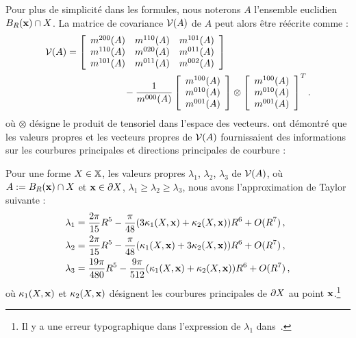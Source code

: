 %
Pour plus de simplicité dans les formules, nous noterons $A$ l'ensemble
euclidien $B_{R}(\mathbf{x}) \cap X$. La matrice de covariance $\mathcal{V}(A)$ de
$A$ peut alors être réécrite comme :
\begin{align}
  \mathcal{V}(A) &=  \left\lbrack
    \begin{array}{ccc}
      m^{200}(A) & m^{110}(A) & m^{101}(A)\\
      m^{110}(A) & m^{020}(A) & m^{011}(A)\\
      m^{101}(A) & m^{011}(A) & m^{002}(A)
    \end{array}
    \right\rbrack\quad\quad\quad\quad\quad\quad \nonumber \\
    &\quad\quad\quad\quad\quad\quad- \frac{1}{m^{000}(A)}
    \left\lbrack
    \begin{array}{c}
      m^{100}(A) \\
      m^{010}(A) \\
      m^{001}(A) \\
    \end{array}
    \right\rbrack
    \otimes
    \left\lbrack
    \begin{array}{c}
      m^{100}(A) \\
      m^{010}(A) \\
      m^{001}(A) \\
    \end{array}
    \right\rbrack^T.
\label{eq:defCov}
\end{align}
%
où $\otimes$ désigne le produit de tensoriel dans l'espace des vecteurs.
%
 ont démontré que les valeurs propres et les
vecteurs propres de $\mathcal{V}(A)$ fournissaient des informations sur les courbures
principales et directions principales de courbure :
%
\begin{lemma}
 \label{lem:pottmann-3d}
 Pour une forme $X \in \mathbb{X}$, les valeurs propres $\lambda_1$,
 $\lambda_2$, $\lambda_3$ de $\mathcal{V}(A)$, où $ A := B_{R}(\mathbf{x}) \cap
 X$ et $\mathbf{x} \in \partial X$, $\lambda_1 \ge \lambda_2 \ge
 \lambda_3$, nous avons l'approximation de Taylor suivante :
 \begin{align}
   \lambda_1& = \frac{2\pi}{15}R^5 - \frac{\pi}{48}(3\kappa_{1}(X,\mathbf{x}) + \kappa_{2}(X,\mathbf{x}))R^6 + O(R^7)\,,\\
   \lambda_2& = \frac{2\pi}{15}R^5 - \frac{\pi}{48}(\kappa_{1}(X,\mathbf{x}) + 3\kappa_{2}(X,\mathbf{x}))R^6 + O(R^7)\,,\\
   \lambda_3& = \frac{19\pi}{480}R^5 - \frac{9\pi}{512}(\kappa_{1}(X,\mathbf{x}) + \kappa_{2}(X,\mathbf{x}))R^6 + O(R^7)\,,
 \end{align}
 où $\kappa_{1}(X,\mathbf{x})$ et $\kappa_{2}(X,\mathbf{x})$ désignent les
 courbures principales de  $\partial X$ au point $\mathbf{x}$.\footnote{Il y a une
 erreur typographique dans l'expression de $\lambda_1$ dans~\cite{Pottmann2007}.}
\end{lemma}
